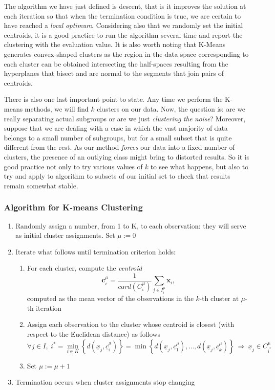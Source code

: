 \documentclass[a4paper]{article}
\begin{document}
	The algorithm we have just defined is descent, that is it improves
	the solution at each iteration so that when the termination condition
	is true, we are certain to have reached a \textsl{local optimum}.
	Considering also that we randomly set the initial centroids, it is a good practice to run the algorithm several time and report the clustering with the evaluation value. It is also worth noting that K-Means generates convex-shaped clusters as the region in the data space corresponding to each cluster can be obtained intersecting the half-spaces resulting from the hyperplanes that bisect and are normal to the segments that join pairs of centroids.
		
	There is also one last important point to state. Any time we perform
	the K-means methods, we will find $k$ clusters on our data. Now,
	the question is: are we really separating actual subgroups or are
	we just \textsl{clustering the noise}? Moreover, suppose that we are
	dealing with a case in which the vast majority of data belongs to
	a small number of subgroups, but for a small subset that is quite
	different from the rest. As our method \textsl{forces} our data into
	a fixed number of clusters, the presence of an outlying class might
	bring to distorted results. So it is good practice not only to try
	various values of $k$ to see what happens, but also to try and apply
	to algorithm to subsets of our initial set to check that results remain
	somewhat stable.
	
	\subsubsection{Algorithm for K-means Clustering}
	\begin{enumerate}
		\item Randomly assign a number, from 1 to K, to each observation: they will
		serve as initial cluster assignments. Set $\mu:=0$
		\item Iterate what follows until termination criterion holds:
		\begin{enumerate}
			\item For each cluster, compute the \textsl{centroid} 
			$$
			\boldsymbol{c}_{i}^{\mu}=\frac{1}{card(C_{i}^{\mu})}\underset{j\in I_{i}^{\mu}}{\sum}\boldsymbol{x}_{i},
			$$
			computed as the mean vector of the observations in the $k$-th cluster
			at $\mu$-th iteration
			\item Assign each observation to the cluster whose centroid is closest (with
			respect to the Euclidean distance) as follows
			$$
			\forall j\in I,\;i^{*}=\underset{i\in K}{\min}\left\{ d(\underline{x}_{j},\underline{c}_{i}^{\mu})\right\} =\min\left\{ d(\underline{x}_{j},\underline{c}_{1}^{\mu}),\ldots,d(\underline{x}_{j},\underline{c}_{k}^{\mu})\right\} \:\Longrightarrow\:\underline{x}_{j}\in C_{i^{*}}^{\mu}
			$$
			\item Set $\mu:=\mu+1$
		\end{enumerate}
		\item Termination occurs when cluster assignments stop changing
	\end{enumerate}
	
\end{document}
